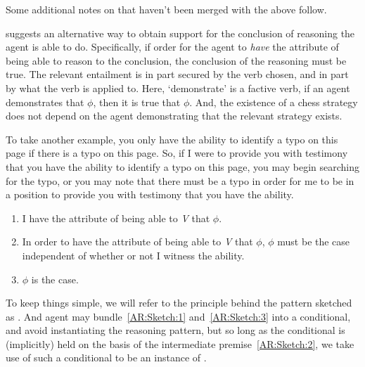\begin{note}
  {
    \color{red}
    Some additional notes on \AR{} that haven't been merged with the above follow.
  }
\end{note}

\begin{note}[Compatibility]
  \AR{} suggests an alternative way to obtain support for the conclusion of reasoning the agent is able to do.
  Specifically, if order for the agent to \emph{have} the attribute of being able to reason to the conclusion, the conclusion of the reasoning must be true.
  The relevant entailment is in part secured by the verb chosen, and in part by what the verb is applied to.
  Here, `demonstrate' is a factive verb, if an agent demonstrates that \(\phi\), then it is true that \(\phi\).
  And, the existence of a chess strategy does not depend on the agent demonstrating that the relevant strategy exists.

  To take another example, you only have the ability to identify a typo on this page if there is a typo on this page.
  So, if I were to provide you with testimony that you have the ability to identify a typo on this page, you may begin searching for the typo, or you may note that there must be a typo in order for me to be in a position to provide you with testimony that you have the ability.
\end{note}

\begin{note}[Sketch of \AR{}]
  \begin{enumerate}[label=(\textsf{A}\arabic*), ref=(\textsf{A}\arabic*)]
  \item\label{AR:Sketch:1} I have the attribute of being able to \emph{V} that \(\phi\).
  \item\label{AR:Sketch:2} In order to have the attribute of being able to \emph{V} that \(\phi\), \(\phi\) must be the case independent of whether or not I witness the ability.
  \item\label{AR:Sketch:3} \(\phi\) is the case.
  \end{enumerate}

  To keep things simple, we will refer to the principle behind the pattern sketched as \AR{}.
  And agent may bundle~\ref{AR:Sketch:1} and~\ref{AR:Sketch:3} into a conditional, and avoid instantiating the reasoning pattern, but so long as the conditional is (implicitly) held on the basis of the intermediate premise~\ref{AR:Sketch:2}, we take use of such a conditional to be an instance of \AR{}.
\end{note}


